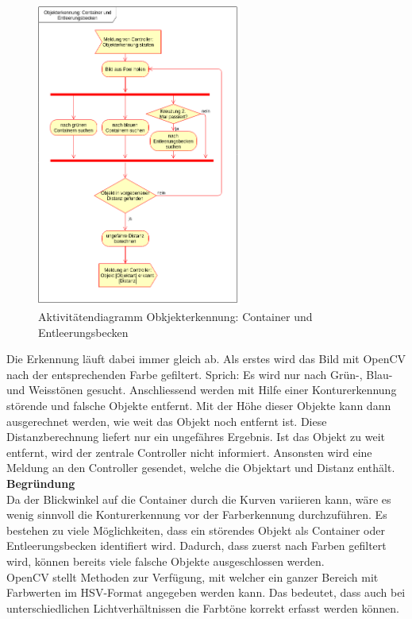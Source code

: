 \begin{figure}[H]%
\centering
\includegraphics[width=0.6\textwidth]{03_Loesungskonzept/pictures/objekterkennung_containers.png}
\caption{Aktivitätendiagramm Obkjekterkennung: Container und Entleerungsbecken}
\label{fig:activityContainer}
\end{figure}
Die Erkennung läuft dabei immer gleich ab. Als erstes wird das Bild mit OpenCV nach der entsprechenden Farbe gefiltert. Sprich: Es wird nur nach Grün-, Blau- und Weisstönen gesucht. Anschliessend werden mit Hilfe einer Konturerkennung störende und falsche Objekte entfernt. Mit der Höhe dieser Objekte kann dann ausgerechnet werden, wie weit das Objekt  noch entfernt ist. Diese Distanzberechnung liefert nur ein ungefähres Ergebnis. Ist das Objekt zu weit entfernt, wird der zentrale Controller nicht informiert. Ansonsten wird eine Meldung an den Controller gesendet, welche die Objektart und Distanz enthält.
\\[0.2cm]
\textbf{Begründung}\\
Da der Blickwinkel auf die Container durch die Kurven variieren kann, wäre es wenig sinnvoll die Konturerkennung vor der Farberkennung durchzuführen. Es bestehen zu viele Möglichkeiten, dass ein störendes Objekt als Container oder Entleerungsbecken identifiert wird. Dadurch, dass zuerst nach Farben gefiltert wird, können bereits viele falsche Objekte ausgeschlossen werden. \\
OpenCV stellt Methoden zur Verfügung, mit welcher ein ganzer Bereich mit Farbwerten im HSV-Format angegeben werden kann. Das bedeutet, dass auch bei unterschiedlichen Lichtverhältnissen die Farbtöne korrekt erfasst werden können.
